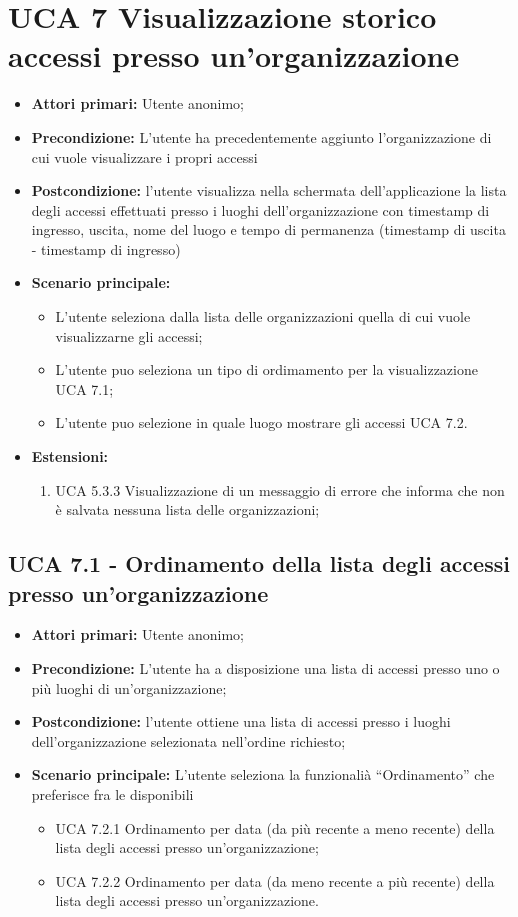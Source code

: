 \newpage
\section{UCA 7 Visualizzazione storico accessi presso un’organizzazione}%
\begin{itemize}
\item \textbf{Attori primari:} Utente anonimo;
\item \textbf{Precondizione:} L’utente ha precedentemente aggiunto l’organizzazione di cui vuole visualizzare i propri accessi 
\item \textbf{Postcondizione:} l’utente visualizza nella schermata dell’applicazione la lista degli accessi effettuati presso i luoghi dell’organizzazione con timestamp di ingresso, uscita, nome del luogo e tempo di permanenza (timestamp di uscita - timestamp di ingresso)
\item \textbf{Scenario principale:} 
\begin{itemize}
\item L’utente seleziona dalla lista delle organizzazioni quella di cui vuole visualizzarne gli accessi;
\item L'utente puo seleziona un tipo di ordimamento per la visualizzazione UCA 7.1;
\item L'utente puo selezione in quale luogo mostrare gli accessi UCA 7.2.
\end{itemize}
\item \textbf{Estensioni:}
\begin{enumerate}
	\item UCA 5.3.3 Visualizzazione di un messaggio di errore che informa che non è salvata nessuna lista delle organizzazioni;	
\end{enumerate}	
\end{itemize}


\subsection{UCA 7.1 - Ordinamento della lista degli accessi presso un’organizzazione}%
\begin{itemize}
\item \textbf{Attori primari:} Utente anonimo;
\item \textbf{Precondizione:} L’utente ha a disposizione una lista di accessi presso uno o più luoghi di un'organizzazione;
\item \textbf{Postcondizione:} l’utente ottiene una lista di accessi presso i luoghi dell’organizzazione selezionata nell’ordine richiesto;
\item \textbf{Scenario principale:} L’utente seleziona la funzionalià “Ordinamento” che preferisce fra le disponibili
	\begin{itemize}
	\item UCA 7.2.1 Ordinamento per data (da più recente a meno recente) della lista degli accessi presso un’organizzazione;
	\item UCA 7.2.2 Ordinamento per data (da meno recente a più recente) della lista degli accessi presso un’organizzazione.
	\end{itemize}
\end{itemize}


